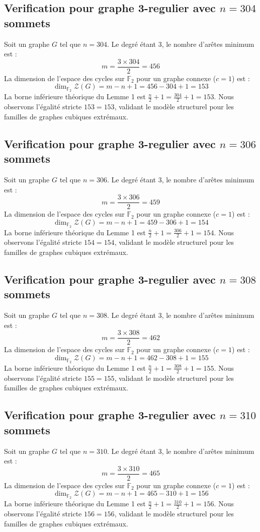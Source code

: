 \documentclass[11pt,a4paper]{article}
\begin{document}
\subsection{Verification pour graphe 3-regulier avec $n=304$ sommets}
Soit un graphe $G$ tel que $n = 304$. Le degré étant 3, le nombre d'arêtes minimum est :
$$ m = \frac{3 \times 304}{2} = 456 $$
La dimension de l'espace des cycles sur $\mathbb{F}_2$ pour un graphe connexe ($c=1$) est :
$$ \dim_{\mathbb{F}_2} \mathcal{Z}(G) = m - n + 1 = 456 - 304 + 1 = 153 $$
La borne inférieure théorique du Lemme 1 est $\frac{n}{2} + 1 = \frac{304}{2} + 1 = 153$.
Nous observons l'égalité stricte $153 = 153$, validant le modèle structurel pour les familles de graphes cubiques extrémaux.

\subsection{Verification pour graphe 3-regulier avec $n=306$ sommets}
Soit un graphe $G$ tel que $n = 306$. Le degré étant 3, le nombre d'arêtes minimum est :
$$ m = \frac{3 \times 306}{2} = 459 $$
La dimension de l'espace des cycles sur $\mathbb{F}_2$ pour un graphe connexe ($c=1$) est :
$$ \dim_{\mathbb{F}_2} \mathcal{Z}(G) = m - n + 1 = 459 - 306 + 1 = 154 $$
La borne inférieure théorique du Lemme 1 est $\frac{n}{2} + 1 = \frac{306}{2} + 1 = 154$.
Nous observons l'égalité stricte $154 = 154$, validant le modèle structurel pour les familles de graphes cubiques extrémaux.

\subsection{Verification pour graphe 3-regulier avec $n=308$ sommets}
Soit un graphe $G$ tel que $n = 308$. Le degré étant 3, le nombre d'arêtes minimum est :
$$ m = \frac{3 \times 308}{2} = 462 $$
La dimension de l'espace des cycles sur $\mathbb{F}_2$ pour un graphe connexe ($c=1$) est :
$$ \dim_{\mathbb{F}_2} \mathcal{Z}(G) = m - n + 1 = 462 - 308 + 1 = 155 $$
La borne inférieure théorique du Lemme 1 est $\frac{n}{2} + 1 = \frac{308}{2} + 1 = 155$.
Nous observons l'égalité stricte $155 = 155$, validant le modèle structurel pour les familles de graphes cubiques extrémaux.

\subsection{Verification pour graphe 3-regulier avec $n=310$ sommets}
Soit un graphe $G$ tel que $n = 310$. Le degré étant 3, le nombre d'arêtes minimum est :
$$ m = \frac{3 \times 310}{2} = 465 $$
La dimension de l'espace des cycles sur $\mathbb{F}_2$ pour un graphe connexe ($c=1$) est :
$$ \dim_{\mathbb{F}_2} \mathcal{Z}(G) = m - n + 1 = 465 - 310 + 1 = 156 $$
La borne inférieure théorique du Lemme 1 est $\frac{n}{2} + 1 = \frac{310}{2} + 1 = 156$.
Nous observons l'égalité stricte $156 = 156$, validant le modèle structurel pour les familles de graphes cubiques extrémaux.
\end{document}
